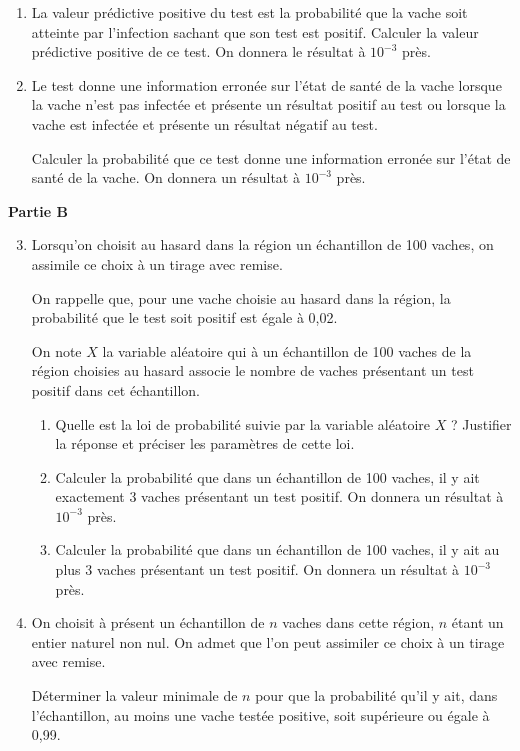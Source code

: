 \documentclass[10pt]{article}
\begin{document}
\begin{enumerate}
\begin{enumerate}
		\item La \og{}valeur prédictive positive du test\fg{} est la probabilité que la vache soit atteinte par l'infection sachant que son test est positif. Calculer la valeur prédictive positive de ce test. On donnera le résultat à $10^{-3}$ près.

		\item Le test donne une information erronée sur l'état de santé de la vache lorsque la vache n'est pas infectée et présente un résultat positif au test ou lorsque la vache est infectée et présente un résultat négatif au test.

		Calculer la probabilité que ce test donne une information erronée sur l'état de santé de la vache. On donnera un résultat à $10^{-3}$ près.
	\end{enumerate}
\end{enumerate}


\textbf{Partie B}

\smallskip

\begin{enumerate}
\setcounter{enumi}{2}
	\item Lorsqu'on choisit au hasard dans la région un échantillon de 100 vaches, on assimile ce choix à un tirage avec remise.

	On rappelle que, pour une vache choisie au hasard dans la région, la probabilité que le test soit positif est égale à 0,02.

	On note $X$ la variable aléatoire qui à un échantillon de 100 vaches de la région choisies au hasard associe le nombre de vaches présentant un test positif dans cet échantillon.

	\begin{enumerate}
		\item Quelle est la loi de probabilité suivie par la variable aléatoire $X$ ? Justifier la réponse et préciser les paramètres de cette loi.

		\item Calculer la probabilité que dans un échantillon de 100 vaches, il y ait exactement 3 vaches présentant un test positif. On donnera un résultat à $10^{-3}$ près.

		\item Calculer la probabilité que dans un échantillon de 100 vaches, il y ait au plus 3 vaches présentant un test positif. On donnera un résultat à $10^{-3}$ près.
	\end{enumerate}

	\item On choisit à présent un échantillon de $n$ vaches dans cette région, $n$ étant un entier naturel non nul. On admet que l'on peut assimiler ce choix à un tirage avec remise.

	Déterminer la valeur minimale de $n$ pour que la probabilité qu'il y ait, dans l'échantillon, au moins une vache testée positive, soit supérieure ou égale à 0,99.
\end{enumerate}

\vspace{1cm}
\end{document}
